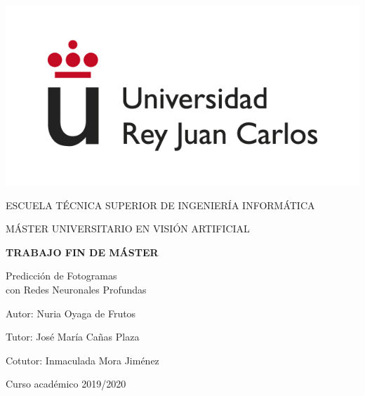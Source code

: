 \begin{titlepage}
	\begin{center}
		\begin{center}
			\includegraphics[width=0.4\linewidth]{figures/logo}
		\end{center}
		\vspace{7.5mm}
		
		\fontsize{15.5}{14}\selectfont ESCUELA TÉCNICA SUPERIOR DE INGENIERÍA INFORMÁTICA
		\vspace{13mm}
		
		\fontsize{14}{14}\selectfont MÁSTER UNIVERSITARIO EN VISIÓN ARTIFICIAL 
		
		\vspace{70pt}
		
		\fontsize{15.7}{14}\selectfont \textbf{TRABAJO FIN DE MÁSTER} 
		
		\vspace{20mm}
		\begin{huge}
			Predicción de Fotogramas \vspace{0.4cm} \\ con Redes Neuronales Profundas
		\end{huge}
		
		\vspace{35mm}
		
		\begin{large}
			Autor: Nuria Oyaga de Frutos
			
			Tutor: José María Cañas Plaza
			
			Cotutor: Inmaculada Mora Jiménez
			
			\vspace{20mm}
		\end{large}
		\begin{normalsize}
			Curso académico 2019/2020	
		\end{normalsize}
		\vspace{10mm}
		
	\end{center}
	
\end{titlepage}

\pagebreak
\thispagestyle{empty}
\vspace*{12cm}

